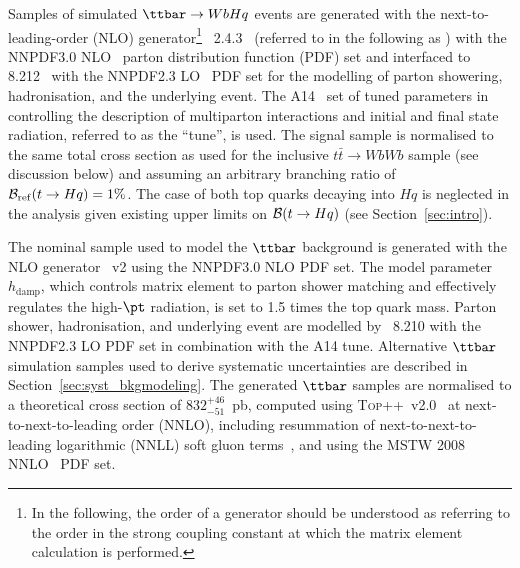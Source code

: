 Samples of simulated $\ttbar \to WbHq$ events are generated with the next-to-leading-order (NLO) generator\footnote{In the following, 
the order of a generator should be understood as referring to the order in the strong coupling constant at which the matrix element calculation 
is performed.} {\amcatnlolong}~2.4.3~\cite{Alwall:2014hca}  (referred to in the following as {\amcatnlo}) with the NNPDF3.0 NLO~\cite{Ball:2014uwa} parton distribution function (PDF) set and interfaced to {\pythia} 8.212~\cite{Sjostrand:2007gs} with the NNPDF2.3 LO~\cite{Ball:2012cx} PDF set for the modelling of parton showering, hadronisation, and the underlying event. 
The A14~\cite{ATLASUETune4} set of tuned parameters in {\pythia} controlling the description of multiparton interactions and  
initial and final state radiation, referred to as the ``tune'', is used.
The signal sample is normalised to the same total cross section as used for the inclusive $t\bar{t}\to WbWb$ sample (see discussion below) and
assuming an arbitrary branching ratio of $\mathcal{B}_{\mathrm{ref}}(t\to Hq)=1\%$.
The case of both top quarks decaying into $Hq$ is neglected in the analysis given existing upper limits on $\mathcal{B}(t \to Hq)$ (see Section~\ref{sec:intro}).

The nominal sample used to model the $\ttbar$ background is generated with the NLO generator {\powheg}~v2 \cite{Frixione:2007nw,Nason:2004rx,Frixione:2007vw,Alioli:2010xd} using the NNPDF3.0 NLO PDF set. The {\powheg} model parameter $h_{\textrm{damp}}$, which controls 
matrix element to parton shower matching and effectively regulates the high-$\pt$ radiation, is set to 1.5 times the top quark mass. 
Parton shower, hadronisation, and underlying event are modelled by {\pythia}~8.210 with the NNPDF2.3 LO PDF set in combination with the A14 tune.
Alternative $\ttbar$ simulation samples used to derive systematic uncertainties are described in Section~\ref{sec:syst_bkgmodeling}. 
The generated $\ttbar$ samples are normalised to a theoretical cross section of $832^{+46}_{-51}$~pb, 
computed using \textsc{Top++}~v2.0~\cite{Czakon:2011xx} at next-to-next-to-leading order (NNLO), 
including resummation of next-to-next-to-leading logarithmic (NNLL) soft gluon 
terms~\cite{Cacciari:2011hy,Baernreuther:2012ws,Czakon:2012zr,Czakon:2012pz,Czakon:2013goa}, 
and using the MSTW 2008 NNLO~\cite{Martin:2009iq,Martin:2009bu} PDF set. 

